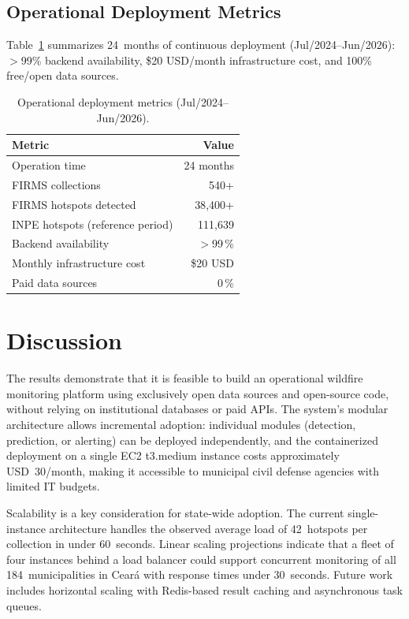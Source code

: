 \documentclass[preprint,times,numbers]{elsarticle}
\begin{document}
\subsection{Operational Deployment Metrics}
\label{sec:operational-perf}

Table~\ref{tab:operational} summarizes 24~months of continuous deployment (Jul/2024--Jun/2026): $>$99\% backend availability, \$20 USD/month infrastructure cost, and 100\% free/open data sources.

\begin{table}[htbp]
\centering
\caption{Operational deployment metrics (Jul/2024--Jun/2026).}
\label{tab:operational}
\small
\begin{tabular}{@{}lr@{}}
\toprule
\textbf{Metric} & \textbf{Value} \\ 
\midrule
Operation time & 24 months \\ 
FIRMS collections & 540+ \\ 
FIRMS hotspots detected & 38{,}400+ \\ 
INPE hotspots (reference period) & 111{,}639 \\ 
Backend availability & $>$99\,\% \\ 
Monthly infrastructure cost & \$20 USD \\ 
Paid data sources & 0\,\% \\
\bottomrule
\end{tabular}
\end{table}

\section{Discussion}
\label{sec:discussion}

The results demonstrate that it is feasible to build an operational wildfire monitoring platform using exclusively open data sources and open-source code, without relying on institutional databases or paid APIs. The system's modular architecture allows incremental adoption: individual modules (detection, prediction, or alerting) can be deployed independently, and the containerized deployment on a single EC2 t3.medium instance costs approximately USD~30/month, making it accessible to municipal civil defense agencies with limited IT budgets.

Scalability is a key consideration for state-wide adoption. The current single-instance architecture handles the observed average load of 42~hotspots per collection in under 60~seconds. Linear scaling projections indicate that a fleet of four instances behind a load balancer could support concurrent monitoring of all 184~municipalities in Cear\'a with response times under 30~seconds. Future work includes horizontal scaling with Redis-based result caching and asynchronous task queues.
\end{document}
